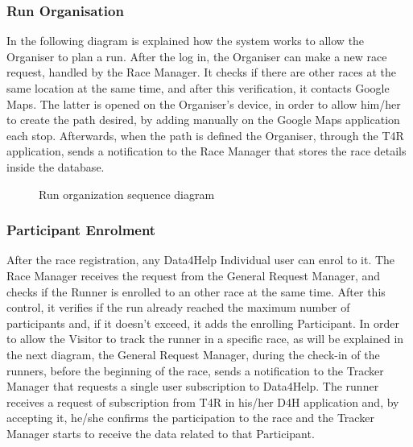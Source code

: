 \subsubsection{Run Organisation}
In the following diagram is explained how the system works to allow the Organiser to plan a run.
After the log in, the Organiser can make a new race request, handled by the Race Manager. It checks if there are other races at the same location at the same time, and after this verification, it contacts Google Maps. The latter is opened on the Organiser's device, in order to allow him/her to create the path desired, by adding manually on the Google Maps application each stop. Afterwards, when the path is defined the Organiser, through the T4R application, sends a notification to the Race Manager that stores the race details inside the database.

\begin{figure}[H]
    \centering
    \caption{Run organization sequence diagram}
    \label{fig:log&regDiagram}
\end{figure}

\subsubsection{Participant Enrolment}
After the race registration, any Data4Help Individual user can enrol to it.
The Race Manager receives the request from the General Request Manager, and checks if the Runner is enrolled to an other race at the same time. After this control, it verifies if the run already reached the maximum number of participants and, if it doesn't exceed, it adds the enrolling Participant.
In order to allow the Visitor to track the runner in a specific race, as will be explained in the next diagram, the General Request Manager, during the check-in of the runners, before the beginning of the race, sends a notification to the Tracker Manager that requests a single user subscription to Data4Help. The runner receives a request of subscription from T4R in his/her D4H application and, by accepting it, he/she confirms the participation to the race and the Tracker Manager starts to receive the data related to that Participant.

